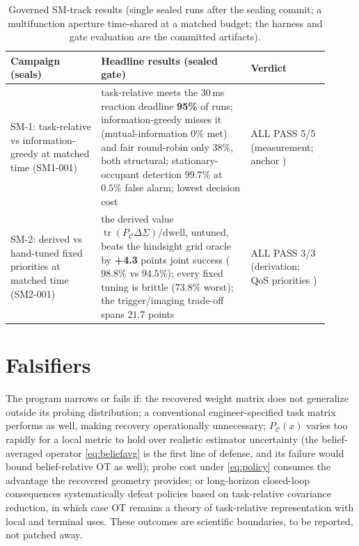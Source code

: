 \documentclass[letterpaper,onecolumn]{IEEEtran}
\theoremstyle{definition}
\theoremstyle{remark}
\newcommand{\PC}{P_{\mathcal{C}}}
\newcommand{\tr}{\operatorname{tr}}
\newcommand{\Sig}{\Sigma}
\begin{document}
\begin{table}[t]
\caption{Governed SM-track results (single sealed runs after the sealing
commit; a multifunction aperture time-shared at a matched budget; the
harness and gate evaluation are the committed artifacts).}
\label{tab:sm-evidence}
\centering
\begin{tabular}{@{}p{0.26\linewidth}p{0.43\linewidth}p{0.22\linewidth}@{}}
\toprule
\textbf{Campaign (seals)} & \textbf{Headline results (sealed gate)} & \textbf{Verdict} \\
\midrule
SM-1: task-relative vs information-greedy at matched time (SM1-001) &
task-relative meets the $30$\,ms reaction deadline \textbf{95\%} of
runs; information-greedy misses it (mutual-information $0\%$ met) and fair
round-robin only $38\%$, both structural; stationary-occupant detection
$99.7\%$ at $0.5\%$ false alarm; lowest decision cost &
ALL PASS 5/5 (measurement; anchor \cite{kreucher2005}) \\
\addlinespace
SM-2: derived vs hand-tuned fixed priorities at matched time (SM2-001) &
the derived value $\tr(\PC\Delta\Sig)/\mathrm{dwell}$, untuned, beats the
hindsight grid oracle by \textbf{+4.3} points joint success ($98.8\%$ vs
$94.5\%$); every fixed tuning is brittle ($73.8\%$ worst); the
trigger/imaging trade-off spans $21.7$ points &
ALL PASS 3/3 (derivation; QoS priorities \cite{rajkumar1997}) \\
\bottomrule
\end{tabular}
\end{table}

\section{Falsifiers}
\label{sec:falsifiers}

The program narrows or fails if: the recovered weight matrix does not
generalize outside its probing distribution; a conventional
engineer-specified task matrix performs as well, making recovery
operationally unnecessary; $\PC(x)$ varies too rapidly for a local metric to
hold over realistic estimator uncertainty (the belief-averaged operator
\eqref{eq:beliefavg} is the first line of defense, and its failure would
bound belief-relative OT as well); probe cost under \eqref{eq:policy}
consumes the advantage the recovered geometry provides; or long-horizon
closed-loop consequences systematically defeat policies based on
task-relative covariance reduction, in which case OT remains a theory of
task-relative representation with local and terminal uses. These
outcomes are scientific boundaries, to be reported, not patched away.
\end{document}
